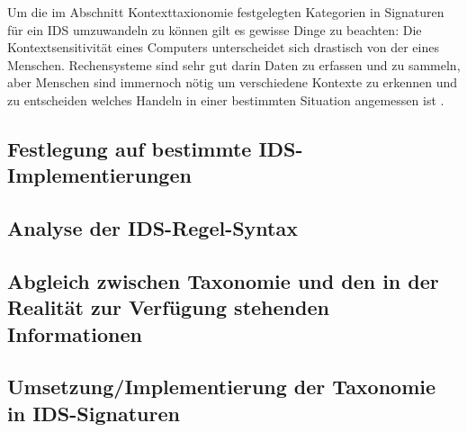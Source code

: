 Um die im Abschnitt Kontexttaxionomie festgelegten Kategorien in Signaturen für ein IDS umzuwandeln zu können gilt es gewisse Dinge zu beachten: Die Kontextsensitivität eines Computers unterscheidet sich drastisch von der eines Menschen. Rechensysteme sind sehr gut darin Daten zu erfassen und zu sammeln, aber Menschen sind immernoch nötig um verschiedene Kontexte zu erkennen und zu entscheiden welches Handeln in einer bestimmten Situation angemessen ist \cite{dey_understanding_2001}.



 
		\subsection{ Festlegung auf bestimmte IDS-Implementierungen}
		\subsection{ Analyse der IDS-Regel-Syntax  }
		\subsection{ Abgleich zwischen Taxonomie und den in der Realität zur Verfügung stehenden Informationen}
		\subsection{ Umsetzung/Implementierung der Taxonomie in  IDS-Signaturen}
